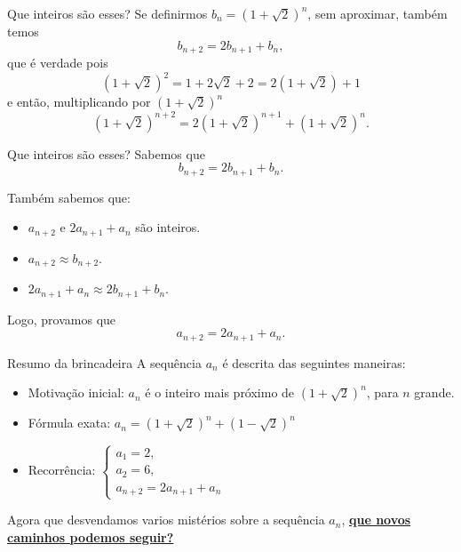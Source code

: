 \documentclass[aspectratio=169, handout]{beamer}
\begin{document}
\begin{frame}{Que inteiros são esses?}
	Se definirmos $b_n = (1+\sqrt{2})^n$, sem aproximar\pause, também temos \[
		b_{n+2} = 2b_{n+1} + b_n,
	\]
	que é verdade pois \pause \[
		(1+\sqrt{2})^2 = 1 + 2\sqrt{2} + 2 = 2 (1+\sqrt{2}) + 1
	\]
	\pause e então, multiplicando por $(1+\sqrt{2})^n$ \[
		(1+\sqrt{2})^{n+2} = 2(1+\sqrt{2})^{n+1} + (1+\sqrt{2})^n.
	\]
\end{frame}

\begin{frame}{Que inteiros são esses?}
	Sabemos que \[
		b_{n+2} = 2b_{n+1} + b_n.
	\]
	
	\pause Também sabemos que:

	\begin{itemize}
		\item $a_{n+2}$ e $2a_{n+1} + a_n$ são inteiros. \pause
		\item $a_{n+2} \approx b_{n+2}$.
		\item $2a_{n+1} + a_n \approx 2b_{n+1} + b_n$.
	\end{itemize}

	\pause Logo, provamos que \[
		a_{n+2} = 2a_{n+1} + a_n.
	\]
\end{frame}

\begin{frame}{Resumo da brincadeira}
	A sequência $a_n$ é descrita das seguintes maneiras: \pause

	\begin{itemize}
		\item Motivação inicial: $a_n$ é o inteiro mais próximo de $(1+\sqrt{2})^n$, {\small para $n$ grande}. \pause
		\item Fórmula exata: $a_n = (1+\sqrt{2})^n + (1-\sqrt{2})^n$ \pause
		\item Recorrência: $\begin{cases} a_1 = 2, \\ a_2 = 6, \\ a_{n+2} = 2a_{n+1} + a_n\end{cases}$
	\end{itemize}

	\vspace{1em}

	\vspace{1em}
	\pause Agora que desvendamos varios mistérios sobre a sequência $a_n$, \underline{\textbf{que novos caminhos podemos seguir?}}
\end{frame}
\end{document}
